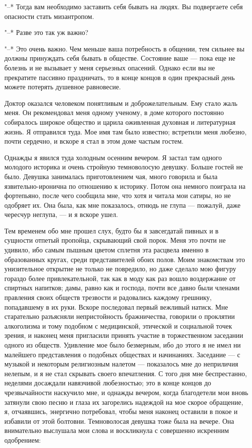 "--*  Тогда  вам  необходимо  заставить   себя  бывать  на  людях.  Вы
подвергаете себя опасности стать мизантропом.

"--* Разве это так уж важно?

"--*  Это очень  важно. Чем  меньше  ваша потребность  в общении,  тем
сильнее вы  должны принуждать себя  бывать в обществе.  Состояние ваше
---  пока еще  не болезнь  и не  вызывает у  меня серьезных  опасений.
Однако если вы не прекратите пассивно праздничать, то в конце концов в
один прекрасный день можете потерять душевное равновесие.

Доктор  оказался человеком  понятливым и  доброжелательным. Ему  стало
жаль  меня.  Он рекомендовал  меня  одному  ученому, в  доме  которого
постоянно собиралось  широкое общество и царила  оживленная духовная и
литературная  жизнь. Я  отправился туда.  Мое имя  там было  известно;
встретили меня  любезно, почти сердечно, и  вскоре я стал в  этом доме
частым гостем.

Однажды я  явился туда холодным  осенним вечером. Я застал  там одного
молодого историка и очень стройную темноволосую девушку. Больше гостей
не  было.  Девушка занималась  приготовлением  чая,  много говорила  и
была язвительно-иронична  по отношению  к историку. Потом  она немного
поиграла на фортепьяно, после чего сообщила мне, что хотя и читала мои
сатиры, но  не одобряет их.  Она была,  как мне показалось,  отнюдь не
глупа --- пожалуй, даже чересчур неглупа, --- и я вскоре ушел.

Тем  временем обо  мне  прошел  слух, будто  бы  я завсегдатай  пивных
и  в  сущности  отпетый  пропойца, скрывающий  свой  порок.  Меня  это
почти  не  удивило,  ибо  самым пышным  цветом  сплетня  эта  расцвела
именно в  образованных кругах, среди представителей  обоих полов. Моим
знакомствам это унизительное открытие не  только не повредило, но даже
сделало  мою фигуру  гораздо  более привлекательной,  так  как в  моду
как  раз  вошло воздержание  от  спиртных  напитков; дамы,  равно  как
и  господа,  почти все  давно  были  членами правления  своих  обществ
трезвости  и  радовались  каждому  грешнику, попадавшему  в  их  руки.
Вскоре последовал  первый вежливый натиск. Мне  старательно разъясняли
непристойность бражничества,  говорили о проклятии алкоголизма  и тому
подобном с медицинской, этической и социальной точек зрения, и наконец
меня пригласили  принять участие  в торжественном заседании  одного из
обществ.  Удивление мое  было безмерным,  ибо до  этого я  не имел  ни
малейшего представления  о подобных обществах и  начинаниях. Заседание
--- с  музыкой и некоторым  религиозным налетом --- показалось  мне до
неприличия нелепым,  и я не  стал скрывать своего впечатления.  С того
дня мне беспрестанно, неделями досаждали навязчивой любезностью; это в
конце концов до чрезвычайности наскучило мне, и однажды вечером, когда
благодетели  мои  вновь затянули  свою  песню  и глаза  их  загорелись
надеждой на мое скорое обращение, я, отчаявшись, энергично потребовал,
чтобы  меня наконец  оставили в  покое  и избавили  от этой  болтовни.
Темноволосая девушка  тоже была  на вечере. Она  внимательно выслушала
мои слова и воскликнула с совершенно искренним одобрением:

